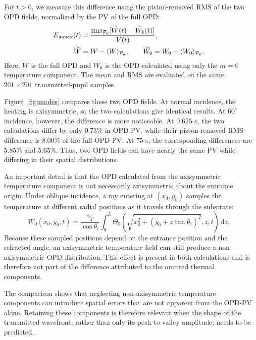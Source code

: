 \documentclass{optica-article}
\newcommand{\dd}{\,\mathrm{d}}
\begin{document}
For $t>0$, we measure this difference using the piston-removed RMS of the two OPD fields, normalized by the PV of the full OPD:
\begin{equation}
 \begin{aligned}
 E_{\rm nonax}(t)&=
 \frac{\operatorname{rms}_{\mathcal P_\theta}
 [\widetilde W(t)-\widetilde W_0(t)]}{V(t)},\\
 \widetilde W&=W-\langle W\rangle_{\mathcal P_\theta},\qquad
 \widetilde W_0=W_0-\langle W_0\rangle_{\mathcal P_\theta}.
 \end{aligned}
 \label{eq:nonax-omission}
\end{equation}
Here, $W$ is the full OPD and $W_0$ is the OPD calculated using only the $m=0$ temperature component.
The mean and RMS are evaluated on the same $201\times201$ transmitted-pupil samples.

Figure~\ref{fig:modes} compares these two OPD fields.
At normal incidence, the heating is axisymmetric, so the two calculations give identical results.
At $60^\circ$ incidence, however, the difference is more noticeable.
At $0.625$ s, the two calculations differ by only $0.73\%$ in OPD-PV, while their piston-removed RMS difference is $8.00\%$ of the full OPD-PV.
At $75$ s, the corresponding differences are $5.85\%$ and $5.65\%$.
Thus, two OPD fields can have nearly the same PV while differing in their spatial distributions.

An important detail is that the OPD calculated from the axisymmetric temperature component is not necessarily axisymmetric about the entrance origin.
Under oblique incidence, a ray entering at $(x_0,y_0)$ samples the temperature at different radial positions as it travels through the substrate:
\begin{equation}
 W_0(x_0,y_0,t)=\frac{\gamma_T}{\cos\theta_t}
 \int_0^L\Theta_0\!\left(
 \sqrt{x_0^2+(y_0+z\tan\theta_t)^2},z,t\right)\dd z.
 \label{eq:axisymmetric-thermal-opd}
\end{equation}
Because these sampled positions depend on the entrance position and the refracted angle, an axisymmetric temperature field can still produce a non-axisymmetric OPD distribution.
This effect is present in both calculations and is therefore not part of the difference attributed to the omitted thermal components.

The comparison shows that neglecting non-axisymmetric temperature components can introduce spatial errors that are not apparent from the OPD-PV alone.
Retaining these components is therefore relevant when the shape of the transmitted wavefront, rather than only its peak-to-valley amplitude, needs to be predicted.
\end{document}

